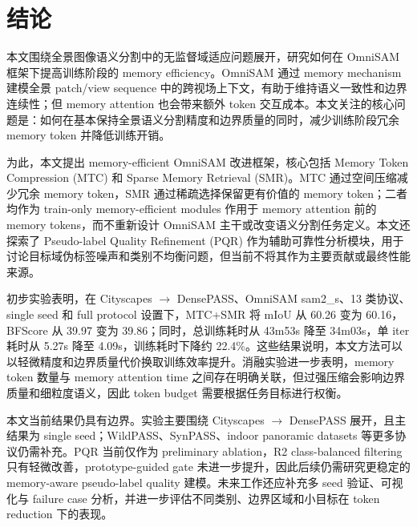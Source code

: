 \section{结论}
\label{sec:conclusion}

本文围绕全景图像语义分割中的无监督域适应问题展开，研究如何在 OmniSAM 框架下提高训练阶段的 memory efficiency。OmniSAM 通过 memory mechanism 建模全景 patch/view sequence 中的跨视场上下文，有助于维持语义一致性和边界连续性；但 memory attention 也会带来额外 token 交互成本。本文关注的核心问题是：如何在基本保持全景语义分割精度和边界质量的同时，减少训练阶段冗余 memory token 并降低训练开销。

为此，本文提出 memory-efficient OmniSAM 改进框架，核心包括 Memory Token Compression (MTC) 和 Sparse Memory Retrieval (SMR)。MTC 通过空间压缩减少冗余 memory token，SMR 通过稀疏选择保留更有价值的 memory token；二者均作为 train-only memory-efficient modules 作用于 memory attention 前的 memory tokens，而不重新设计 OmniSAM 主干或改变语义分割任务定义。本文还探索了 Pseudo-label Quality Refinement (PQR) 作为辅助可靠性分析模块，用于讨论目标域伪标签噪声和类别不均衡问题，但当前不将其作为主要贡献或最终性能来源。

初步实验表明，在 Cityscapes $\rightarrow$ DensePASS、OmniSAM sam2\_s、13 类协议、single seed 和 full protocol 设置下，MTC+SMR 将 mIoU 从 60.26 变为 60.16，BFScore 从 39.97 变为 39.86；同时，总训练耗时从 43m53s 降至 34m03s，单 iter 耗时从 5.27s 降至 4.09s，训练耗时下降约 22.4\%。这些结果说明，本文方法可以以轻微精度和边界质量代价换取训练效率提升。消融实验进一步表明，memory token 数量与 memory attention time 之间存在明确关联，但过强压缩会影响边界质量和细粒度语义，因此 token budget 需要根据任务目标进行权衡。

本文当前结果仍具有边界。实验主要围绕 Cityscapes $\rightarrow$ DensePASS 展开，且主结果为 single seed；WildPASS、SynPASS、indoor panoramic datasets 等更多协议仍需补充。PQR 当前仅作为 preliminary ablation，R2 class-balanced filtering 只有轻微改善，prototype-guided gate 未进一步提升，因此后续仍需研究更稳定的 memory-aware pseudo-label quality 建模。未来工作还应补充多 seed 验证、可视化与 failure case 分析，并进一步评估不同类别、边界区域和小目标在 token reduction 下的表现。
